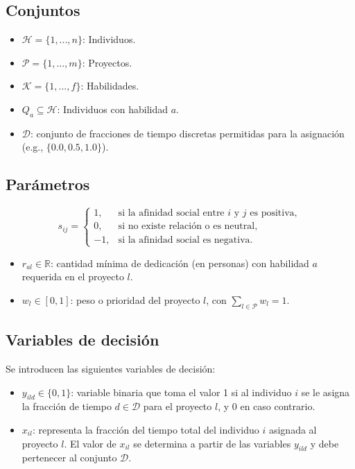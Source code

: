 \documentclass[conference]{IEEEtran}
\begin{document}
\subsection{Conjuntos}
\begin{itemize}
    \item $\mathcal{H} = \{1, ..., n\}$: Individuos.
    \item $\mathcal{P} = \{1, ..., m\}$: Proyectos.
    \item $\mathcal{K} = \{1, ..., f\}$: Habilidades.
    \item $Q_a \subseteq \mathcal{H}$: Individuos con habilidad $a$.
    \item $\mathcal{D}$: conjunto de fracciones de tiempo discretas permitidas para la asignación (e.g., $\{0.0, 0.5, 1.0\}$).
\end{itemize}


\subsection{Parámetros}
\[
    s_{ij} =
    \begin{cases}
        1,  & \text{si la afinidad social entre } i \text{ y } j \text{ es positiva}, \\
        0,  & \text{si no existe relación o es neutral},                              \\
        -1, & \text{si la afinidad social es negativa}.
    \end{cases}
\]
\begin{itemize}
    \item $r_{al} \in \mathbb{R}$: cantidad mínima de dedicación (en personas) con habilidad $a$ requerida en el proyecto $l$.
    \item $w_l \in [0,1]$: peso o prioridad del proyecto $l$, con $\sum_{l \in \mathcal{P}} w_l = 1$.
\end{itemize}

\subsection{Variables de decisión}

Se introducen las siguientes variables de decisión:
\begin{itemize}
    \item \(y_{ild} \in \{0,1\}\): variable binaria que toma el valor 1 si al individuo \(i\) se le asigna la fracción de tiempo \(d \in \mathcal{D}\) para el proyecto \(l\), y 0 en caso contrario.
    \item \(x_{il}\): representa la fracción del tiempo total del individuo \(i\) asignada al proyecto \(l\). El valor de \(x_{il}\) se determina a partir de las variables \(y_{ild}\) y debe pertenecer al conjunto \(\mathcal{D}\).
\end{itemize}
\end{document}
